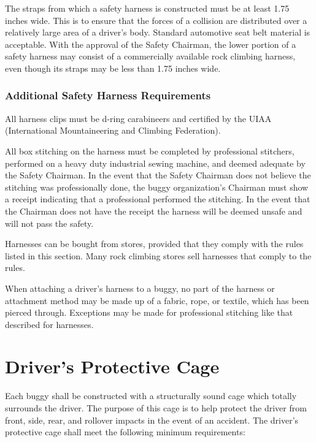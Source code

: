 	The straps from which a safety harness is constructed must be at least 1.75 inches wide. This is to ensure that the forces of a collision are distributed over a relatively large area of a driver's body. Standard automotive seat belt material is acceptable. With the approval of the Safety Chairman, the lower portion of a safety harness may consist of a commercially available rock climbing harness, even though its straps may be less than 1.75 inches wide.

\subsubsection{Additional Safety Harness Requirements}

	All harness clips must be d-ring carabineers and certified by the UIAA (International Mountaineering and Climbing Federation).
	
	All box stitching on the harness must be completed by professional stitchers, performed on a heavy duty industrial sewing machine, and deemed adequate by the Safety Chairman. In the event that the Safety Chairman does not believe the stitching was professionally done, the buggy organization's Chairman must show a receipt indicating that a professional performed the stitching. In the event that the Chairman does not have the receipt the harness will be deemed unsafe and will not pass the safety. 
	
	Harnesses can be bought from stores, provided that they comply with the rules listed in this section. Many rock climbing stores sell harnesses that comply to the rules.

	When attaching a driver's harness to a buggy, no part of the harness or attachment method may be made up of a fabric, rope, or textile, which has been pierced through. Exceptions may be made for professional stitching like that described for harnesses.

\section{Driver's Protective Cage}

	Each buggy shall be constructed with a structurally sound cage which totally surrounds the driver. The purpose of this cage is to help protect the driver from front, side, rear, and rollover impacts in the event of an accident. The driver's protective cage shall meet the following minimum requirements:

